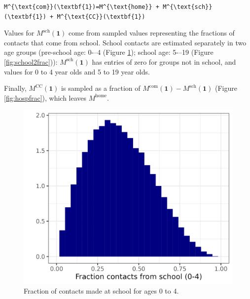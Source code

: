 \documentclass[
]{article}
\begin{document}
\begin{verbatim}
M^{\text{com}}(\textbf{1})=M^{\text{home}} + M^{\text{sch}}(\textbf{1}) + M^{\text{CC}}(\textbf{1}) 
\end{verbatim}

Values for \(M^{\text{sch}}(\textbf{1})\) come from sampled values representing the fractions of contacts that come from school. School contacts are estimated separately in two age groups (pre-school age: 0-\/--4 (Figure \ref{fig:school1frac}); school age: 5-\/--19 (Figure \ref{fig:school2frac})): \(M^{\text{sch}}(\textbf{1})\) has entries of zero for groups not in school, and values for 0 to 4 year olds and 5 to 19 year olds.

Finally, \(M^{\text{CC}}(\textbf{1})\) is sampled as a fraction of \(M^{\text{com}}(\textbf{1})- M^{\text{sch}}(\textbf{1})\) (Figure \ref{fig:hospfrac}), which leaves \(M^{\text{home}}\).

\begin{figure}
\includegraphics[width=25in]{README_files/figure-gfm/school1frac} \caption{Fraction of contacts made at school for ages 0 to 4.}\label{fig:school1frac}
\end{figure}
\end{document}
